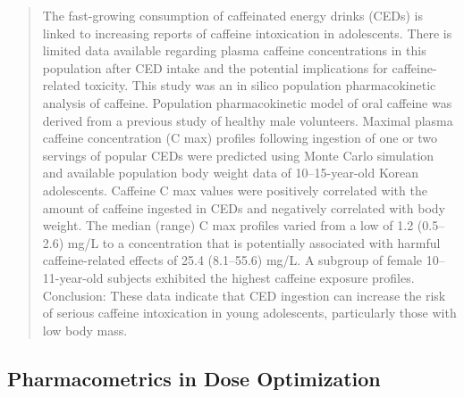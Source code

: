 \documentclass[]{book}
\begin{document}
\begin{quote}
The fast-growing consumption of caffeinated energy drinks (CEDs) is
linked to increasing reports of caffeine intoxication in adolescents.
There is limited data available regarding plasma caffeine concentrations
in this population after CED intake and the potential implications for
caffeine-related toxicity. This study was an in silico population
pharmacokinetic analysis of caffeine. Population pharmacokinetic model
of oral caffeine was derived from a previous study of healthy male
volunteers. Maximal plasma caffeine concentration (C max) profiles
following ingestion of one or two servings of popular CEDs were
predicted using Monte Carlo simulation and available population body
weight data of 10--15-year-old Korean adolescents. Caffeine C max values
were positively correlated with the amount of caffeine ingested in CEDs
and negatively correlated with body weight. The median (range) C max
profiles varied from a low of 1.2 (0.5--2.6) mg/L to a concentration
that is potentially associated with harmful caffeine-related effects of
25.4 (8.1--55.6) mg/L. A subgroup of female 10--11-year-old subjects
exhibited the highest caffeine exposure profiles. Conclusion: These data
indicate that CED ingestion can increase the risk of serious caffeine
intoxication in young adolescents, particularly those with low body
mass.
\end{quote}

\subsection{Pharmacometrics in Dose
Optimization}\label{pharmacometrics-in-dose-optimization}
\end{document}
